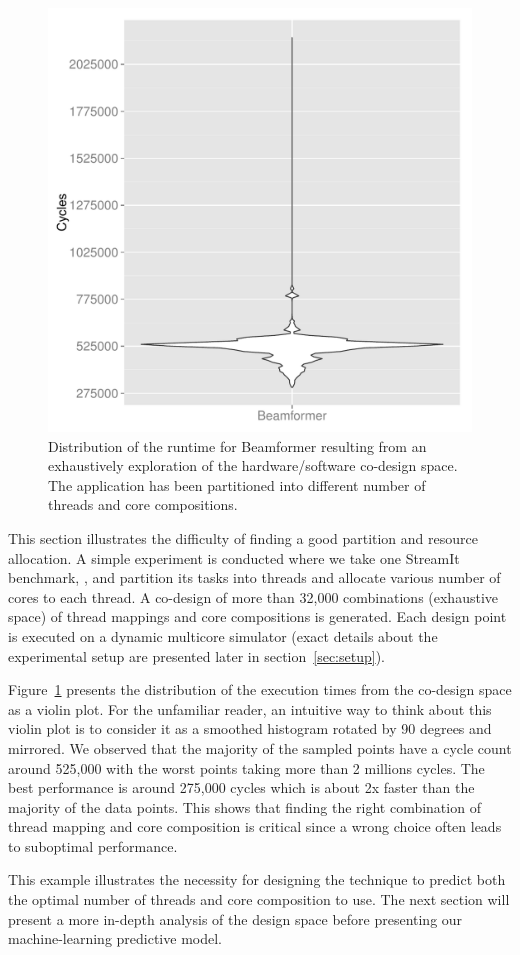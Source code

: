 \begin{figure}[t]
    \centering
    \includegraphics[width=1\textwidth]{streamit-paper/graphics/beamformer_motivation.pdf}
    \caption{Distribution of the runtime for Beamformer resulting from an exhaustively exploration of the hardware/software co-design space.
     The application has been partitioned into different number of threads and core compositions.}
     \label{fig:beamformermotiv}
\end{figure}

This section illustrates the difficulty of finding a good partition and resource allocation.
A simple experiment is conducted where we take one StreamIt benchmark, , and partition its tasks into threads and allocate various number of cores to each thread.
A co-design of more than 32,000 combinations (exhaustive space) of thread mappings and core compositions is generated.
Each design point is executed on a dynamic multicore simulator (exact details about the experimental setup are presented later in section~\ref{sec:setup}).

Figure~\ref{fig:beamformermotiv} presents the distribution of the execution times from the co-design space as a violin plot.
For the unfamiliar reader, an intuitive way to think about this violin plot is to consider it as a smoothed histogram rotated by 90 degrees and mirrored.
We observed that the majority of the sampled points have a cycle count around 525,000 with the worst points taking more than 2 millions cycles.
The best performance is around 275,000 cycles which is about 2x faster than the majority of the data points.
This shows that finding the right combination of thread mapping and core composition is critical since a wrong choice often leads to suboptimal performance.

This example illustrates the necessity for designing the technique to predict both the optimal number of threads and core composition to use.
The next section will present a more in-depth analysis of the design space before presenting our machine-learning predictive model.

